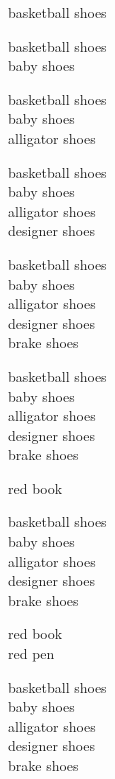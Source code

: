 \documentclass{article}
\begin{document}
\begin{huge}
basketball shoes


basketball shoes\\
baby shoes


basketball shoes\\
baby shoes\\
alligator shoes


basketball shoes\\
baby shoes\\
alligator shoes\\
designer shoes


basketball shoes\\
baby shoes\\
alligator shoes\\
designer shoes\\
brake shoes


basketball shoes\\
baby shoes\\
alligator shoes\\
designer shoes\\
brake shoes

red book


basketball shoes\\
baby shoes\\
alligator shoes\\
designer shoes\\
brake shoes

red book\\
red pen


basketball shoes\\
baby shoes\\
alligator shoes\\
designer shoes\\
brake shoes


\end{huge}
\end{document}

